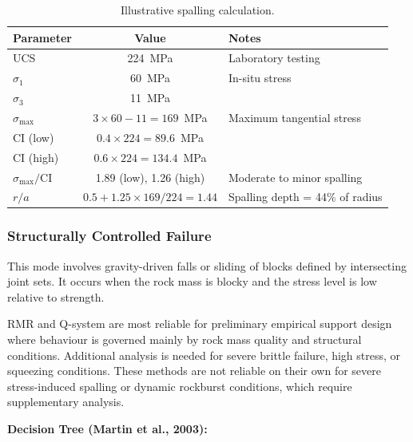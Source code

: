 \documentclass[a4paper,12pt]{article}
\begin{document}
\begin{table}[ht]
\centering
\begin{tabular}{lcl}
\toprule
\textbf{Parameter} & \textbf{Value} & \textbf{Notes} \\
\midrule
UCS & 224~MPa & Laboratory testing \\
$\sigma_1$ & 60~MPa & In-situ stress \\
$\sigma_3$ & 11~MPa & \\
$\sigma_{\max}$ & $3\times 60 - 11 = 169$~MPa & Maximum tangential stress \\
CI (low) & $0.4\times224 = 89.6$~MPa & \\
CI (high) & $0.6\times224 = 134.4$~MPa & \\
$\sigma_{\max}/\mathrm{CI}$ & 1.89 (low), 1.26 (high) & Moderate to minor spalling \\
$r/a$ & $0.5 + 1.25\times169/224 = 1.44$ & Spalling depth = 44\% of radius \\
\bottomrule
\end{tabular}
\caption{Illustrative spalling calculation.}
\end{table}

\subsubsection{Structurally Controlled Failure}
This mode involves gravity-driven falls or sliding of blocks defined by intersecting joint sets. It occurs when the rock mass is blocky and the stress level is low relative to strength.

\begin{notebox}
RMR and Q-system are most reliable for preliminary empirical support design where behaviour is governed mainly by rock mass quality and structural conditions. Additional analysis is needed for severe brittle failure, high stress, or squeezing conditions. These methods are not reliable on their own for severe stress-induced spalling or dynamic rockburst conditions, which require supplementary analysis.
\end{notebox}

\textbf{Decision Tree (Martin et al., 2003):}
\end{document}
